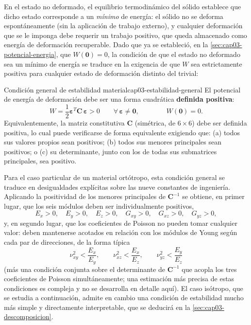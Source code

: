 En el estado no deformado, el equilibrio termodinámico del sólido establece que dicho estado corresponde a un \emph{mínimo} de energía: el sólido no se deforma espontáneamente (sin la aplicación de trabajo externo), y cualquier deformación que se le imponga debe requerir un trabajo positivo, que queda almacenado como energía de deformación recuperable. Dado que ya se estableció, en la \cref{sec:cap03-potencial-energia}, que $W(\bm 0)=0$, la condición de que el estado no deformado sea un mínimo de energía se traduce en la exigencia de que $W$ sea estrictamente positiva para cualquier estado de deformación distinto del trivial:

\begin{ecnimportante}{Condición general de estabilidad material}{cap03-estabilidad-general}
El potencial de energía de deformación debe ser una forma cuadrática \textbf{definida positiva}:
\[
W = \frac{1}{2}\bm\varepsilon^{T}\bm C\,\bm\varepsilon > 0 \qquad \forall\,\bm\varepsilon\neq\bm 0, \qquad\qquad W(\bm 0) = 0.
\]
Equivalentemente, la matriz constitutiva $\bm C$ (simétrica, de $6\times 6$) debe ser definida positiva, lo cual puede verificarse de forma equivalente exigiendo que: (a) todos sus valores propios sean positivos; (b) todos sus menores principales sean positivos; o (c) su determinante, junto con los de todas sus submatrices principales, sea positivo.
\end{ecnimportante}

Para el caso particular de un material ortótropo, esta condición general se traduce en desigualdades explícitas sobre las nueve constantes de ingeniería. Aplicando la positividad de los menores principales de $\bm C^{-1}$ se obtiene, en primer lugar, que los seis módulos deben ser individualmente positivos,
\[
E_x>0,\quad E_y>0,\quad E_z>0,\quad G_{xy}>0,\quad G_{xz}>0,\quad G_{yz}>0,
\]
y, en segundo lugar, que los coeficientes de Poisson no pueden tomar cualquier valor: deben mantenerse acotados en relación con los módulos de Young según cada par de direcciones, de la forma típica
\[
\nu_{xy}^2 < \frac{E_x}{E_y}, \qquad \nu_{xz}^2 < \frac{E_x}{E_z}, \qquad \nu_{yz}^2 < \frac{E_y}{E_z}
\]
(más una condición conjunta sobre el determinante de $\bm C^{-1}$ que acopla los tres coeficientes de Poisson simultáneamente; una estimación más precisa de estas condiciones es compleja y no se desarrolla en detalle aquí). El caso isótropo, que se estudia a continuación, admite en cambio una condición de estabilidad mucho más simple y directamente interpretable, que se deducirá en la \cref{sec:cap03-descomposicion}.

